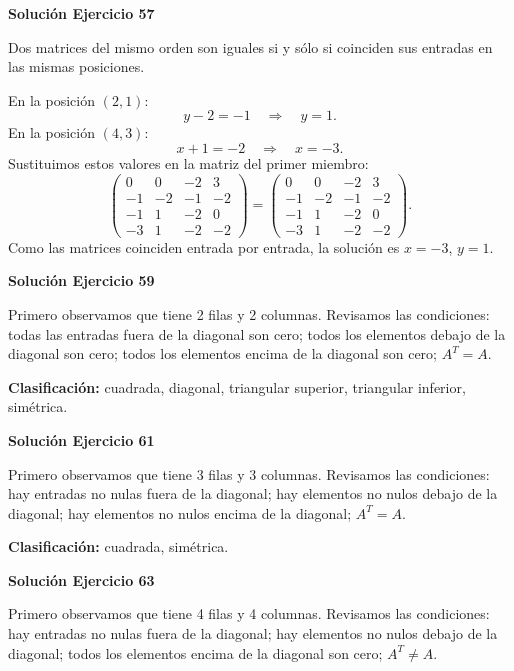 \documentclass[12pt]{article}
\begin{document}
\par\bigskip\noindent\textbf{Solución Ejercicio 57}\par\nobreak
Dos matrices del mismo orden son iguales si y sólo si coinciden sus entradas en las mismas posiciones.

En la posición $(2,1)$:
\[
y - 2=-1\quad\Longrightarrow\quad y=1.
\]
En la posición $(4,3)$:
\[
x + 1=-2\quad\Longrightarrow\quad x=-3.
\]
Sustituimos estos valores en la matriz del primer miembro:
\[
\begin{pmatrix}0&0&-2&3\\-1&-2&-1&-2\\-1&1&-2&0\\-3&1&-2&-2\end{pmatrix}=\begin{pmatrix}0&0&-2&3\\-1&-2&-1&-2\\-1&1&-2&0\\-3&1&-2&-2\end{pmatrix}.
\]
Como las matrices coinciden entrada por entrada, la solución es $x=-3$, $y=1$.


\par\bigskip\noindent\textbf{Solución Ejercicio 59}\par\nobreak
Primero observamos que tiene 2 filas y 2 columnas. Revisamos las condiciones: todas las entradas fuera de la diagonal son cero; todos los elementos debajo de la diagonal son cero; todos los elementos encima de la diagonal son cero; $A^T=A$.

\textbf{Clasificación:} cuadrada, diagonal, triangular superior, triangular inferior, simétrica.


\par\bigskip\noindent\textbf{Solución Ejercicio 61}\par\nobreak
Primero observamos que tiene 3 filas y 3 columnas. Revisamos las condiciones: hay entradas no nulas fuera de la diagonal; hay elementos no nulos debajo de la diagonal; hay elementos no nulos encima de la diagonal; $A^T=A$.

\textbf{Clasificación:} cuadrada, simétrica.


\par\bigskip\noindent\textbf{Solución Ejercicio 63}\par\nobreak
Primero observamos que tiene 4 filas y 4 columnas. Revisamos las condiciones: hay entradas no nulas fuera de la diagonal; hay elementos no nulos debajo de la diagonal; todos los elementos encima de la diagonal son cero; $A^T\ne A$.
\end{document}
